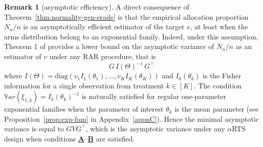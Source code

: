 \documentclass[11pt]{article}
\theoremstyle{plain}
\theoremstyle{definition}
\newtheorem{corollary}[theorem]{Corollary}
\newtheorem{remark}[theorem]{Remark}
\begin{document}
\begin{remark}[asymptotic efficiency] A direct consequence of Theorem~\ref{thm:normality-gen-erade} is that the empirical allocation proportion $N_n/n$ is an asymptotically efficient estimator of the target $v$, at least when the arms distribution belong to an exponential family. Indeed, under this assumption, Theorem 1 of \cite{hu2006asymptotically} provides a lower bound on the asymptotic variance of $N_n/n$ as an estimator of $v$ under any RAR procedure, that is
\[G\,I(\Theta)^{-1}\,G^{\top }\]
where  \(I(\Theta) = \mathrm{diag}\left(v_1 I_1(\theta_1), \dots, v_K I_K(\theta_K)\right)\) and \(I_k(\theta_k)\) is the Fisher information for a single observation from treatment \(k \in [K]\). The condition $\mathbb{V}ar(\xi_{1,k}) = I_k(\theta_k)^{-1}$ is naturally satisfied for regular one-parameter exponential families when the parameter of interest $\theta_k$ is the mean parameter (see Proposition~\ref{prop:exp-fam} in Appendix~\ref{appnC}). Hence the minimal asymptotic variance is equal to $GVG^{\top}$, which is the asymptotic variance under any $\alpha$RTS design when conditions \hyperlink{CA}{\textbf{A}}--\hyperlink{CB}{\textbf{B}} are satisfied.
\end{remark}

%
%
%
%
%
\end{document}
